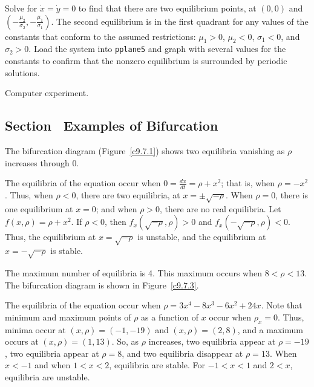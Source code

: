 \documentclass{ximera}
\begin{document}
\newpage
{}
Solve  for $\dot{x} = \dot{y} = 0$ to find that there are
two equilibrium points, at $(0,0)$ and $(-\frac{\mu_2}{\sigma_2},
-\frac{\mu_1}{\sigma_1})$.  The second equilibrium is in the first
quadrant for any values of the constants that conform to the assumed
restrictions: $\mu_1 > 0$, $\mu_2 < 0$, $\sigma_1 < 0$, and
$\sigma_2 > 0$.  Load the system into {\tt pplane5} and graph with
several values for the constants to confirm that the nonzero
equilibrium is surrounded by periodic solutions.

  Computer experiment.



\subsection*{Section~\protect{\ref{S:bifurcation}} Examples of Bifurcation}

\ans The bifurcation diagram (Figure~\ref{c9.7.1}) shows two equilibria
vanishing as $\rho$ increases through $0$.

\soln The equilibria of the equation occur when $0 = \frac{dx}{dt} =
\rho + x^2$; that is, when $\rho = -x^2$.  Thus, when $\rho < 0$, there
are two equilibria, at $x = \pm\sqrt{-\rho}$.  When $\rho = 0$, there is
one equilibrium at $x = 0$; and when $\rho > 0$, there are no real
equilibria.  Let $f(x,\rho) = \rho + x^2$.  If $\rho < 0$, 
then $f_x(\sqrt{-\rho},\rho) > 0$ and $f_x(-\sqrt{-\rho},\rho) < 0$. 
Thus, the equilibrium at $x = \sqrt{-\rho}$ is unstable, and the
equilibrium at $x = -\sqrt{-\rho}$ is stable.

\begin{figure}[htb]
                       \centerline{%
                       }
\end{figure}

\ans The maximum number of equilibria is 4.  This maximum occurs when
$8 < \rho < 13$.  The bifurcation diagram is shown in Figure~\ref{c9.7.3}.

\soln The equilibria of the equation occur when
$\rho = 3x^4 - 8x^3 - 6x^2 + 24x$.  Note that minimum and maximum points of
$\rho$ as a function of $x$ occur when $\rho_x = 0$.  Thus, minima occur
at $(x,\rho) = (-1,-19)$ and $(x,\rho) = (2,8)$, and a maximum occurs at
$(x,\rho) = (1,13)$.  So, as $\rho$ increases, two equilibria appear at
$\rho = -19$, two equilibria appear at $\rho = 8$, and two equilibria
disappear at $\rho = 13$.  When $x < -1$ and when $1 < x < 2$, equilibria
are stable.  For $-1 < x < 1$ and $2 < x$, equilibria are unstable.
\end{document}
